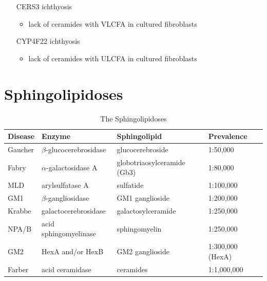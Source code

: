 \documentclass{scrartcl}
\begin{document}
\begin{enumerate}
\begin{itemize}
\item[{CERS3}] ichthyosis
\begin{itemize}
\item lack of ceramides with VLCFA in cultured fibroblasts
\end{itemize}
\item[{CYP4F22}] ichthyosis
\begin{itemize}
\item lack of ceramides with ULCFA in cultured fibroblasts
\end{itemize}
\end{itemize}
\end{enumerate}

\section{Sphingolipidoses}
\label{sec:org8782a8e}

\begin{table}[htbp]
\caption{\label{tab:org2032e8f}
The Sphingolipidoses}
\centering
\begin{tabular}{llll}
Disease & Enzyme & Sphingolipid & Prevalence\\
\hline
Gaucher & \(\beta\)-glucocerebrosidase & glucocerebroside & 1:50,000\\
Fabry & \(\alpha\)-galactosidase A & globotriaosylceramide (Gb3) & 1:80,000\\
MLD & arylsulfatase A & sulfatide & 1:100,000\\
GM1 & \(\beta\)-gangliosidase & GM1 ganglioside & 1:200,000\\
Krabbe & galactocerebrosidase & galactosylceramide & 1:250,000\\
NPA/B & acid sphingomyelinase & sphingomyelin & 1:250,000\\
GM2 & HexA and/or HexB & GM2 ganglioside & 1:300,000 (HexA)\\
Farber & acid ceramidase & ceramides & 1:1,000,000\\
\end{tabular}
\end{table}
\end{document}
